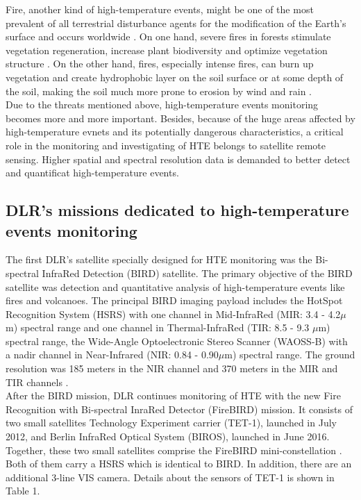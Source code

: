 \noindent Fire, another kind of high-temperature events, might be one of the most prevalent of all terrestrial disturbance agents for the modification of the Earth's surface and occurs worldwide \parencite{Reference6}. On one hand, severe fires in forests stimulate vegetation regeneration, increase plant biodiversity and optimize vegetation structure \parencite{Reference7}. On the other hand, fires, especially intense fires, can burn up vegetation and create hydrophobic layer on the soil surface or at some depth of the soil, making the soil much more prone to erosion by wind and rain \parencite{Reference8}.\\

\noindent Due to the threats mentioned above, high-temperature events monitoring becomes more and more important. Besides, because of the huge areas affected by high-temperature evnets and its potentially dangerous characteristics, a critical role in the monitoring and investigating of HTE belongs to satellite remote sensing. Higher spatial and spectral resolution data is demanded to better detect and quantificat high-temperature events.\\


\subsection{DLR's missions dedicated to high-temperature events monitoring}

The first DLR's satellite specially designed for HTE monitoring was the Bi-spectral InfraRed Detection (BIRD) satellite. The primary objective of the BIRD satellite was detection and quantitative analysis of high-temperature events like fires and volcanoes. The principal BIRD imaging payload includes the HotSpot Recognition System (HSRS) with one channel in Mid-InfraRed (MIR: 3.4 - 4.2$\mu$m) spectral range and one channel in Thermal-InfraRed (TIR: 8.5 - 9.3 $\mu$m) spectral range, the Wide-Angle Optoelectronic Stereo Scanner (WAOSS-B) with a nadir channel in Near-Infrared (NIR: 0.84 - 0.90$\mu$m) spectral range. The ground resolution was 185 meters in the NIR channel and 370 meters in the MIR and TIR channels \parencite{Reference9}.\\

\noindent After the BIRD mission, DLR continues monitoring of HTE with the new Fire Recognition with Bi-spectral InraRed Detector (FireBIRD) mission. It consists of two small satellites Technology Experiment carrier (TET-1), launched in July 2012, and Berlin InfraRed Optical System (BIROS), launched in June 2016. Together, these two small satellites comprise the FireBIRD mini-constellation \parencite{Reference10}. Both of them carry a HSRS which is identical to BIRD. In addition, there are an additional 3-line VIS camera. Details about the sensors of TET-1 is shown in Table 1.\\


